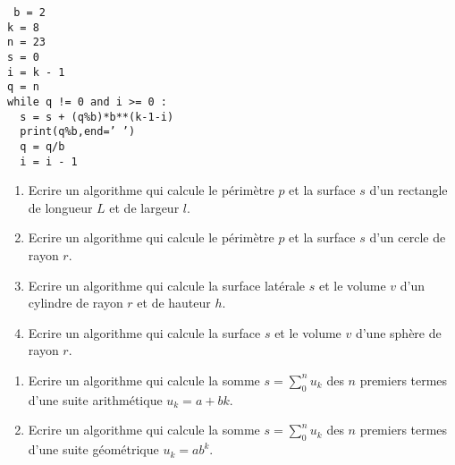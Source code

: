 \begin{td}
\begin{minipage}[t]{7cm}
\begin{enumerate}
	{\footnotesize\tt
	b = 2\\
	k = 8\\
	n = 23\\
	s = 0\\
	i = k - 1\\
	q = n\\
	while q != 0 and i >= 0 :\\
  	\mbox{}\ \ s = s + (q\%b)*b**(k-1-i)\\
  	\mbox{}\ \ print(q\%b,end=' ')\\
  	\mbox{}\ \ q = q/b\\
  	\mbox{}\ \ i = i - 1
	}
\end{enumerate}
\end{minipage}
\end{td}


\begin{td}\label{td:geometrieInstruc}\em {}
\begin{enumerate}
\item Ecrire un algorithme qui calcule le périmètre $p$ et la surface $s$ d'un rectangle de longueur
	$L$ et de largeur $l$.
\item Ecrire un algorithme qui calcule le périmètre $p$ et la surface $s$ d'un cercle de rayon $r$.
\item Ecrire un algorithme qui calcule la surface latérale $s$ et le volume $v$ d'un cylindre de rayon $r$
	et de hauteur $h$.
\item Ecrire un algorithme qui calcule la surface $s$ et le volume $v$ d'une sphère de rayon $r$.
\end{enumerate}
\end{td}

\begin{td}\label{td:suites}\em {}
\begin{enumerate}
\item Ecrire un algorithme qui calcule la somme $s = \sum_0^n u_k$ des $n$ premiers termes d'une suite 
	arithmétique $u_k = a + bk$.
\item Ecrire un algorithme qui calcule la somme $s = \sum_0^n u_k$ des $n$ premiers termes d'une suite 
	géométrique $u_k = ab^k$.
\end{enumerate}
\end{td}

